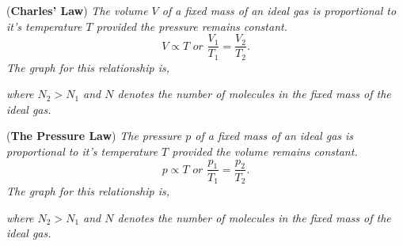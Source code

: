 \begin{theorem}{(\textbf{Charles' Law})}
\textit{The volume $V$ of a fixed mass of an ideal gas is proportional to it's temperature $T$ provided the pressure remains constant.}
\begin{equation}
    V \propto T \textit{ or } \frac{V_1}{T_1} = \frac{V_2}{T_2}.
\end{equation}
\textit{The graph for this relationship is,}
\begin{figure}[h!]
    \centering
\end{figure}
\FloatBarrier
\noindent \textit{where $N_2 > N_1$ and $N$ denotes the number of molecules in the fixed mass of the ideal gas.}
\end{theorem}

\begin{theorem}{(\textbf{The Pressure Law})}
\textit{The pressure $p$ of a fixed mass of an ideal gas is proportional to it's temperature $T$ provided the volume remains constant.}
\begin{equation}
    p \propto T \textit{ or } \frac{p_1}{T_1} = \frac{p_2}{T_2}.
\end{equation}
\textit{The graph for this relationship is,}
\begin{figure}[h!]
    \centering
\end{figure}
\FloatBarrier
\noindent \textit{where $N_2 > N_1$ and $N$ denotes the number of molecules in the fixed mass of the ideal gas.}
\end{theorem}

